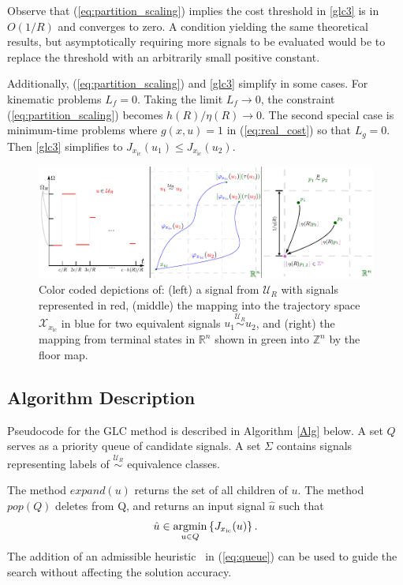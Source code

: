 \documentclass{llncs}
\newcommand{\GLC}{\ensuremath{\mathrm{GLC}}\xspace}
\begin{document}
%
Observe that (\ref{eq:partition_scaling}) implies the cost threshold in \ref{glc3} is in $O(1/R)$ and converges to zero.
%
A condition yielding the same theoretical results, but asymptotically requiring more signals to be evaluated would be to replace the threshold with an arbitrarily small positive constant. 
%

%
Additionally, (\ref{eq:partition_scaling}) and \ref{glc3} simplify in some cases.
%
For kinematic problems $L_{f}=0$.
%
Taking the limit $L_{f}\rightarrow 0$, the constraint (\ref{eq:partition_scaling}) becomes $h(R)/\eta(R)\rightarrow 0$.
%
The second special case is minimum-time problems where $g(x,u)=1$ in (\ref{eq:real_cost}) so that $L_{g}=0$. 
%
Then \ref{glc3} simplifies to $J_{x_\mathrm{ic}}(u_{1}) \leq J_{x_\mathrm{ic}}(u_{2})$.

\begin{figure}[htb]
\centering{}\includegraphics[width=1\textwidth]{Graphics/Theory_Intuition/intuition}
\caption{\label{fig:intuition} Color coded depictions of: (left) a signal from $\mathcal{U}_R$ with signals represented in red, (middle) the mapping into the trajectory space $\mathcal{X}_{x_\mathrm{ic}}$ in blue for two equivalent signals $u_1 \overset{\mathcal{U}_R}{\sim}u_2$, and (right) the mapping from terminal states in $\mathbb{R}^n$ shown in green into $\mathbb{Z}^n$ by the floor map.}
\end{figure}

\subsection{Algorithm Description} 

Pseudocode for the \GLC method is described in Algorithm \ref{Alg} below. A set $Q$ serves as a priority queue of candidate signals. A set $\Sigma$ contains signals representing labels of $\overset{\mathcal{U}_R}{\sim}$ equivalence classes.

The method $expand(u)$ returns the set of all children of $u$. 
%
The method $pop(Q)$ deletes from Q, and returns an input signal $\hat{u}$ such that 
%
\begin{equation}
\hat{u}\in\underset{u\in Q}{{\rm argmin}}\left\{ J_{x_\mathrm{ic}}(u)\right\}. \label{eq:queue}
\end{equation} 
%
The addition of an admissible heuristic~\cite{hart1968formal} in (\ref{eq:queue}) can be used to guide the search without affecting the solution accuracy.  
\end{document}

